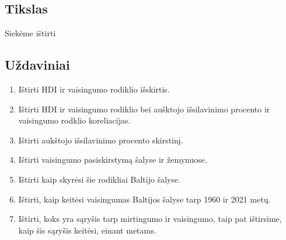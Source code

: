 \subsection{Tikslas} 
Siekėme ištirti 

\subsection{Uždaviniai}
\begin{enumerate}
    \item Ištirti HDI ir vaisingumo rodiklio išskirtis.
    \item Ištirti HDI ir vaisingumo rodiklio bei aušktojo išsilavinimo procento ir vaisingumo rodklio koreliacijas.
    \item Ištirti aukštojo išsilavinimo procento skirstinį.
    \item Ištirti vaisingumo pasiskirstymą šalyse ir žemynuose.
    \item Ištirti kaip skyrėsi šie rodikliai Baltijo šalyse.
    \item Ištirti, kaip keitėsi vaisingumas Baltijos šalyse tarp 1960 ir 2021 metų.
    \item Ištirti, koks yra sąryšis tarp mirtingumo ir vaisingumo, taip pat ištirsime, kaip šis sąryšis keitėsi, einant metams.
\end{enumerate}